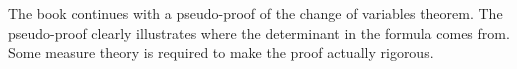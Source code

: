 \documentclass[11pt]{article}
\newcommand{\R}{\mathbf{R}}
\newcommand{\M}{\mathcal{M}}
\begin{document}
\begin{itemize}
\begin{itemize}
    \end{itemize}
    The book continues with a pseudo-proof of the change of variables theorem. The pseudo-proof clearly illustrates where the determinant in the formula comes from. Some measure theory is required to make the proof actually rigorous.
    
    
    
    
    
\end{itemize}


\setcounter{secnumdepth}{3}
\end{document}
